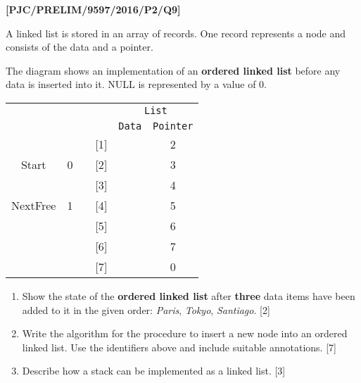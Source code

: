 \item \textbf{{[}PJC/PRELIM/9597/2016/P2/Q9{]} }

A linked list is stored in an array of records. One record represents
a node and consists of the data and a pointer. 

The diagram shows an implementation of an \textbf{ordered linked list}
before any data is inserted into it. NULL is represented by a value
of 0. 
\noindent \begin{center}
\begin{tabular}{cccc|c|c|}
 &  &  & \multicolumn{1}{c}{} & \multicolumn{2}{c}{\texttt{List}}\tabularnewline
 &  &  & \multicolumn{1}{c}{} & \multicolumn{1}{c}{\texttt{Data}} & \multicolumn{1}{c}{\texttt{Pointer}}\tabularnewline
\cline{5-6} \cline{6-6} 
 &  &  & {[}1{]} &  & 2\tabularnewline
\cline{2-2} \cline{5-6} \cline{6-6} 
\multicolumn{1}{c|}{Start} & \multicolumn{1}{c|}{0} &  & {[}2{]} &  & 3\tabularnewline
\cline{2-2} \cline{5-6} \cline{6-6} 
 &  &  & {[}3{]} &  & 4\tabularnewline
\cline{2-2} \cline{5-6} \cline{6-6} 
\multicolumn{1}{c|}{NextFree} & \multicolumn{1}{c|}{1} &  & {[}4{]} &  & 5\tabularnewline
\cline{2-2} \cline{5-6} \cline{6-6} 
 &  &  & {[}5{]} &  & 6\tabularnewline
\cline{5-6} \cline{6-6} 
 &  &  & {[}6{]} &  & 7\tabularnewline
\cline{5-6} \cline{6-6} 
 &  &  & {[}7{]} &  & 0\tabularnewline
\cline{5-6} \cline{6-6} 
\end{tabular}
\par\end{center}
\begin{enumerate}
\item Show the state of the \textbf{ordered linked list} after \textbf{three}
data items have been added to it in the given order: \emph{Paris},
\emph{Tokyo}, \emph{Santiago}.\hfill{} {[}2{]}
\item Write the algorithm for the procedure to insert a new node into an
ordered linked list. Use the identifiers above and include suitable
annotations.\hfill{} {[}7{]}
\item Describe how a stack can be implemented as a linked list. \hfill{}{[}3{]}
\end{enumerate}